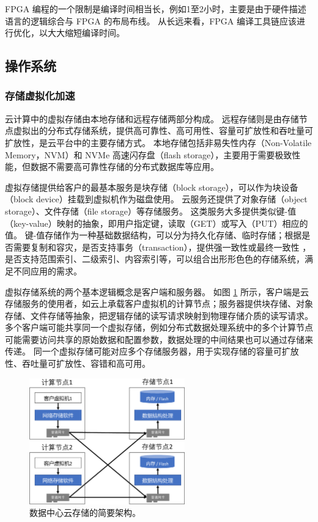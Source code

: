 FPGA 编程的一个限制是编译时间相当长，例如1至2小时，主要是由于硬件描述语言的逻辑综合与 FPGA 的布局布线。
从长远来看，FPGA 编译工具链应该进行优化，以大大缩短编译时间。

\subsection{操作系统}
\label{future:os}




\subsubsection{存储虚拟化加速}
\label{future:storage-virtualization}

云计算中的虚拟存储由本地存储和远程存储两部分构成。
远程存储则是由存储节点虚拟出的分布式存储系统，提供高可靠性、高可用性、容量可扩放性和吞吐量可扩放性，是云平台中的主要存储方式。
本地存储包括非易失性内存（Non-Volatile Memory，NVM）和 NVMe 高速闪存盘（flash storage），主要用于需要极致性能，但数据不需要高可靠性存储的分布式数据库等应用。

虚拟存储提供给客户的最基本服务是块存储（block storage），可以作为块设备（block device）挂载到虚拟机作为磁盘使用。
云服务还提供了对象存储（object storage）、文件存储（file storage）等存储服务。
这类服务大多提供类似键-值（key-value）映射的抽象，即用户指定键，读取（GET）或写入（PUT）相应的值。
键-值存储作为一种基础数据结构，可以分为持久化存储、临时存储；根据是否需要复制和容灾，是否支持事务（transaction），提供强一致性或最终一致性 \cite{anna}，是否支持范围索引、二级索引、内容索引等，可以组合出形形色色的存储系统，满足不同应用的需求。

虚拟存储系统的两个基本逻辑概念是客户端和服务器。
如图 \ref{background:fig:storage_arch} 所示，客户端是云存储服务的使用者，如云上承载客户虚拟机的计算节点；服务器提供块存储、对象存储、文件存储等抽象，把逻辑存储的读写请求映射到物理存储介质的读写请求。
多个客户端可能共享同一个虚拟存储，例如分布式数据处理系统中的多个计算节点可能需要访问共享的原始数据和配置参数，数据处理的中间结果也可以通过存储来传递。
同一个虚拟存储可能对应多个存储服务器，用于实现存储的容量可扩放性、吞吐量可扩放性、容错和高可用。


\begin{figure}[htbp]
	\centering
	\includegraphics[width=0.6\textwidth]{figures/storage_arch.pdf}
	\caption{数据中心云存储的简要架构。}
	\label{background:fig:storage_arch}
\end{figure}



